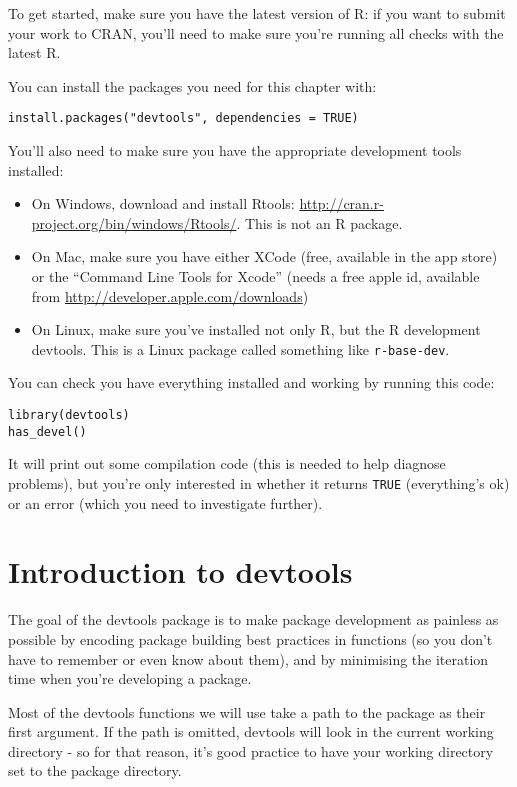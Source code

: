 To get started, make sure you have the latest version of R: if you want
to submit your work to CRAN, you'll need to make sure you're running all
checks with the latest R.

You can install the packages you need for this chapter with:

\begin{verbatim}
install.packages("devtools", dependencies = TRUE)
\end{verbatim}

You'll also need to make sure you have the appropriate development tools
installed:

\begin{itemize}
\item
  On Windows, download and install Rtools:
  \url{http://cran.r-project.org/bin/windows/Rtools/}. This is not an R
  package.
\item
  On Mac, make sure you have either XCode (free, available in the app
  store) or the ``Command Line Tools for Xcode'' (needs a free apple id,
  available from \url{http://developer.apple.com/downloads})
\item
  On Linux, make sure you've installed not only R, but the R development
  devtools. This is a Linux package called something like
  \texttt{r-base-dev}.
\end{itemize}

You can check you have everything installed and working by running this
code:

\begin{verbatim}
library(devtools)
has_devel()
\end{verbatim}

It will print out some compilation code (this is needed to help diagnose
problems), but you're only interested in whether it returns
\texttt{TRUE} (everything's ok) or an error (which you need to
investigate further).

\section{Introduction to devtools}

The goal of the devtools package is to make package development as
painless as possible by encoding package building best practices in
functions (so you don't have to remember or even know about them), and
by minimising the iteration time when you're developing a package.

Most of the devtools functions we will use take a path to the package as
their first argument. If the path is omitted, devtools will look in the
current working directory - so for that reason, it's good practice to
have your working directory set to the package directory.

